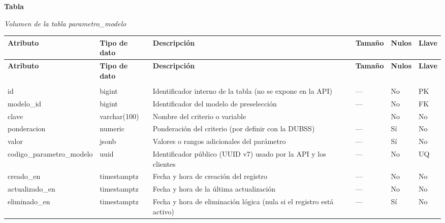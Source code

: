 \label{tab:volumen_parametro_modelo}
\noindent\textbf{Tabla~\thetable}\par\nopagebreak
\noindent\textit{Volumen de la tabla parametro\_\allowbreak{}modelo}\par\nopagebreak
\begingroup\small\linespread{1}\selectfont\setlength{\tabcolsep}{4pt}
\begin{longtable}{>{\raggedright\arraybackslash}p{3.4cm} >{\raggedright\arraybackslash}p{2.5cm} >{\raggedright\arraybackslash}p{4.8cm} >{\centering\arraybackslash}p{1.6cm}>{\centering\arraybackslash}p{1.1cm} >{\centering\arraybackslash}p{1.3cm}}
\toprule
\textbf{Atributo} & \textbf{Tipo de dato} & \textbf{Descripción} & \textbf{Tamaño} & \textbf{Nulos} & \textbf{Llave} \\
\midrule
\endfirsthead
\toprule
\textbf{Atributo} & \textbf{Tipo de dato} & \textbf{Descripción} & \textbf{Tamaño} & \textbf{Nulos} & \textbf{Llave} \\
\midrule
\endhead
\endfoot
\bottomrule
\multicolumn{6}{l}{\textit{Nota.} Elaboración propia.} \\
\endlastfoot
id & bigint & Identificador interno de la tabla (no se expone en la API) & — & No & PK \\
modelo\_\allowbreak{}id & bigint & Identificador del modelo de preselección & — & No & FK \\
clave & varchar(100) & Nombre del criterio o variable & 100 & No & No \\
ponderacion & numeric & Ponderación del criterio (por definir con la DUBSS) & — & Sí & No \\
valor & jsonb & Valores o rangos adicionales del parámetro & — & Sí & No \\
codigo\_\allowbreak{}parametro\_\allowbreak{}modelo & uuid & Identificador público (UUID v7) usado por la API y los clientes & — & No & UQ \\
creado\_\allowbreak{}en & timestamptz & Fecha y hora de creación del registro & — & No & No \\
actualizado\_\allowbreak{}en & timestamptz & Fecha y hora de la última actualización & — & No & No \\
eliminado\_\allowbreak{}en & timestamptz & Fecha y hora de eliminación lógica (nula si el registro está activo) & — & Sí & No \\
\end{longtable}
\endgroup
\addtocounter{table}{-1}


